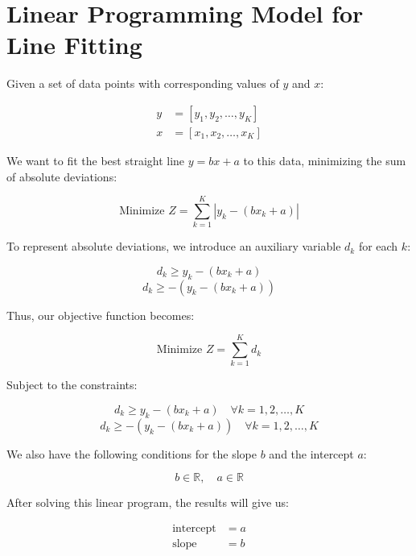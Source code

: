 \documentclass{article}
\begin{document}
\section*{Linear Programming Model for Line Fitting}

Given a set of data points with corresponding values of \(y\) and \(x\):

\[
\begin{align*}
y & = [y_{1}, y_{2}, \ldots, y_{K}] \\
x & = [x_{1}, x_{2}, \ldots, x_{K}]
\end{align*}
\]

We want to fit the best straight line \(y = bx + a\) to this data, minimizing the sum of absolute deviations:

\[
\text{Minimize } Z = \sum_{k=1}^{K} |y_k - (bx_k + a)|
\]

To represent absolute deviations, we introduce an auxiliary variable \(d_k\) for each \(k\):

\[
d_k \geq y_k - (bx_k + a)
\]
\[
d_k \geq -(y_k - (bx_k + a))
\]

Thus, our objective function becomes:

\[
\text{Minimize } Z = \sum_{k=1}^{K} d_k
\]

Subject to the constraints:

\[
d_k \geq y_k - (bx_k + a) \quad \forall k = 1, 2, \ldots, K
\]
\[
d_k \geq -(y_k - (bx_k + a)) \quad \forall k = 1, 2, \ldots, K
\]

We also have the following conditions for the slope \(b\) and the intercept \(a\):

\[
b \in \mathbb{R}, \quad a \in \mathbb{R}
\]

After solving this linear program, the results will give us:

\[
\begin{align*}
\text{intercept} & = a \\
\text{slope} & = b
\end{align*}
\]
\end{document}
